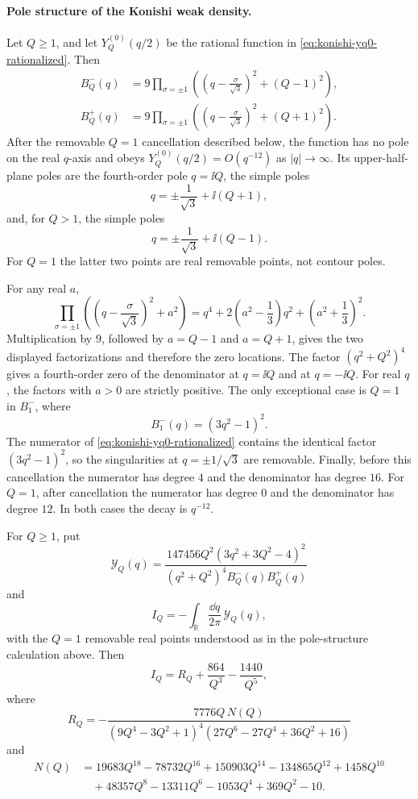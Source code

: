 \paragraph{Pole structure of the Konishi weak density.}
Let \(Q\geq1\), and let \(Y_Q^{(0)}(q/2)\) be the rational function in
\eqref{eq:konishi-yq0-rationalized}.  Then
\[
\begin{aligned}
  B_Q^-(q)
  &=
  9\prod_{\sigma=\pm1}
  \left(\left(q-\frac{\sigma}{\sqrt3}\right)^2+(Q-1)^2\right),
\\
  B_Q^+(q)
  &=
  9\prod_{\sigma=\pm1}
  \left(\left(q-\frac{\sigma}{\sqrt3}\right)^2+(Q+1)^2\right).
\end{aligned}
\]
After the removable \(Q=1\) cancellation described below, the function has no
pole on the real \(q\)-axis and obeys \(Y_Q^{(0)}(q/2)=O(q^{-12})\) as
\(|q|\to\infty\).  Its upper-half-plane poles are the fourth-order pole
\(q=\ii Q\), the simple poles
\[
  q=\pm\frac1{\sqrt3}+\ii(Q+1),
\]
and, for \(Q>1\), the simple poles
\[
  q=\pm\frac1{\sqrt3}+\ii(Q-1).
\]
For \(Q=1\) the latter two points are real removable points, not contour
poles.

For any real \(a\),
\[
  \prod_{\sigma=\pm1}
  \left(\left(q-\frac{\sigma}{\sqrt3}\right)^2+a^2\right)
  =
  q^4+2\left(a^2-\frac13\right)q^2
  +\left(a^2+\frac13\right)^2 .
\]
Multiplication by \(9\), followed by \(a=Q-1\) and \(a=Q+1\), gives the two
displayed factorizations and therefore the zero locations.  The factor
\((q^2+Q^2)^4\) gives a fourth-order zero of the denominator at
\(q=\ii Q\) and at \(q=-\ii Q\).  For real \(q\), the factors with
\(a>0\) are strictly positive.  The only exceptional case is \(Q=1\) in
\(B_1^-\), where
\[
  B_1^-(q)=(3q^2-1)^2 .
\]
The numerator of \eqref{eq:konishi-yq0-rationalized} contains the identical
factor \((3q^2-1)^2\), so the singularities at \(q=\pm1/\sqrt3\) are
removable.  Finally, before this cancellation the numerator has degree
\(4\) and the denominator has degree \(16\).  For \(Q=1\), after cancellation
the numerator has degree \(0\) and the denominator has degree \(12\).  In both
cases the decay is \(q^{-12}\).

\begin{lemma}
\label{lem:konishi-residue-reduction}
For \(Q\geq1\), put
\[
  \mathcal Y_Q(q)
  =
  \frac{147456Q^2(3q^2+3Q^2-4)^2}
       {(q^2+Q^2)^4B_Q^-(q)B_Q^+(q)}
\]
and
\[
  I_Q=-\int_{\mathbb R}\frac{\dd q}{2\pi}\,\mathcal Y_Q(q),
\]
with the \(Q=1\) removable real points understood as in
the pole-structure calculation above.  Then
\begin{equation}
  I_Q=R_Q+\frac{864}{Q^3}-\frac{1440}{Q^5},
  \label{eq:konishi-iq-summand}
\end{equation}
where
\[
  R_Q
  =
  -\frac{7776Q\,N(Q)}
  {(9Q^4-3Q^2+1)^4(27Q^6-27Q^4+36Q^2+16)}
\]
and
\[
\begin{aligned}
  N(Q)
  &=
  19683Q^{18}-78732Q^{16}+150903Q^{14}-134865Q^{12}
  +1458Q^{10}
\\
  &\quad
  +48357Q^8-13311Q^6-1053Q^4+369Q^2-10 .
\end{aligned}
\]
\end{lemma}

